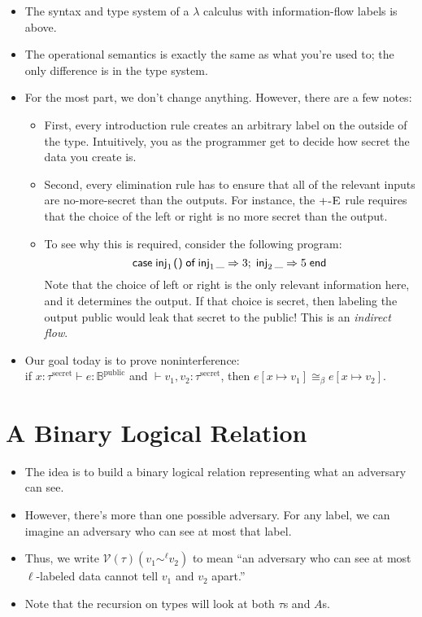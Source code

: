 \documentclass{lecturenotes}
\newcommand{\unit}{\ensuremath{\textsf{(}\mkern0.5mu\textsf{)}}}
\newcommand{\injl}[1]{\ensuremath{\textsf{inj}_1\mkern2mu#1}}
\newcommand{\injr}[1]{\ensuremath{\textsf{inj}_2\mkern3mu#1}}
\newcommand{\case}[5]{\ensuremath{\textsf{case}\mkern5mu#1\mkern5mu\textsf{of}\mkern5mu\injl{#2} \Rightarrow #3;\mkern5mu\injr{#4} \Rightarrow #5\mkern5mu\textsf{end}}}
\newcommand{\pub}{\text{public}}
\newcommand{\priv}{\text{secret}}
\begin{document}
\begin{itemize}
\item The syntax and type system of a $\lambda$ calculus with information-flow labels is above.
\item The operational semantics is exactly the same as what you're used to; the only difference is in the type system.
\item For the most part, we don't change anything.
  However, there are a few notes:
  \begin{itemize}
  \item First, every introduction rule creates an arbitrary label on the outside of the type.
    Intuitively, you as the programmer get to decide how secret the data you create is.
  \item Second, every elimination rule has to ensure that all of the relevant inputs are no-more-secret than the outputs.
    For instance, the $+\textsc{-E}$ rule requires that the choice of the left or right is no more secret than the output.
  \item To see why this is required, consider the following program:
    $$
    \case{\injl{\unit}}{\_}{3}{\_}{5}
    $$
    Note that the choice of left or right is the only relevant information here, and it determines the output.
    If that choice is secret, then labeling the output public would leak that secret to the public!
    This is an \emph{indirect flow}.
  \end{itemize}
\item Our goal today is to prove noninterference:\\ if $x : \tau^\priv \vdash e : \mathbb{B}^\pub$ and $\vdash v_1, v_2 : \tau^\priv$, then $e[x \mapsto v_1] \cong_{\beta} e[x \mapsto v_2]$.
\end{itemize}

\section{A Binary Logical Relation}
\label{sec:binary-logic-relat}

\begin{itemize}
\item The idea is to build a binary logical relation representing what an adversary can see.
\item However, there's more than one possible adversary.
  For any label, we can imagine an adversary who can see at most that label.
\item Thus, we write $\mathcal{V}(\tau)(v_1 \sim^\ell v_2)$ to mean ``an adversary who can see at most $\ell$-labeled data cannot tell $v_1$ and $v_2$ apart.''
\item Note that the recursion on types will look at both $\tau$s and $A$s.
\end{itemize}
\end{document}
